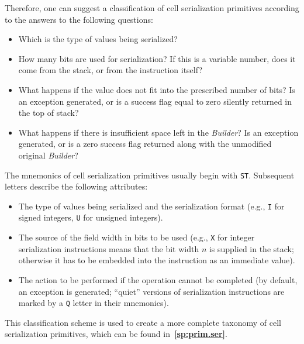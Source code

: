 \documentclass[12pt,oneside]{article}
\def\refpoint#1{{\rm\textbf{\ref{#1}}}}
\let\ptref=\refpoint
\begin{document}
    Therefore, one can suggest a classification of cell serialization primitives according to the answers to the following questions:
    \begin{itemize}
        \item Which is the type of values being serialized?
        \item How many bits are used for serialization? If this is a variable number, does it come from the stack, or from the instruction itself?
        \item What happens if the value does not fit into the prescribed number of bits? Is an exception generated, or is a success flag equal to zero silently returned in the top of stack?
        \item What happens if there is insufficient space left in the {\em Builder}? Is an exception generated, or is a zero success flag returned along with the unmodified original {\em Builder}?
    \end{itemize}
    The mnemonics of cell serialization primitives usually begin with \texttt{ST}. Subsequent letters describe the following attributes:
    \begin{itemize}
        \item The type of values being serialized and the serialization format (e.g., \texttt{I} for signed integers, \texttt{U} for unsigned integers).
        \item The source of the field width in bits to be used (e.g., \texttt{X} for integer serialization instructions means that the bit width $n$ is supplied in the stack; otherwise it has to be embedded into the instruction as an immediate value).
        \item The action to be performed if the operation cannot be completed (by default, an exception is generated; ``quiet'' versions of serialization instructions are marked by a \texttt{Q} letter in their mnemonics).
    \end{itemize}
    This classification scheme is used to create a more complete taxonomy of cell serialization primitives, which can be found in~\ptref{sp:prim.ser}.
\end{document}
